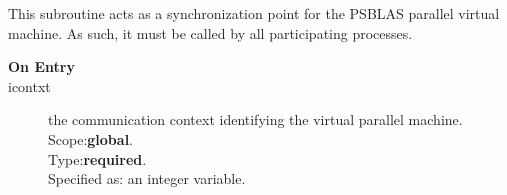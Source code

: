 

This subroutine acts as a synchronization point for  the  PSBLAS
parallel virtual  machine. As such, it must be called by all
participating processes. 
\begin{description}
\item[\bf  On Entry ]
\item[icontxt] the communication context identifying the virtual
  parallel machine.\\
Scope:{\bf global}.\\
Type:{\bf required}.\\
Specified as: an integer variable.
\end{description}



%
%


